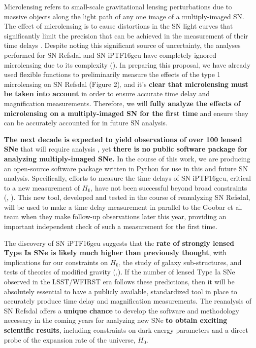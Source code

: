 Microlensing refers to small-scale gravitational lensing
perturbations due to massive objects along the light path of any one image of a
multiply-imaged SN. The effect of microlensing is to cause distortions in the SN light
curves that significantly limit the precision that can be achieved in the measurement of 
their time delays \citep{Dobler:2006}. Despite noting this significant source of uncertainty, the analyses performed for SN Refsdal and SN iPTF16geu 
have completely ignored microlensing due to its complexity (\cite{More:2016,Rodney:2016}). In preparing this proposal, we have already 
used flexible functions to preliminarily measure the effects of the type 1 microlensing on SN Refsdal (Figure 2), and it's 
\textbf{clear that microlensing must be taken into account} in order to ensure accurate time delay and magnification measurements. 
Therefore, we will \textbf{fully analyze the effects of microlensing on a multiply-imaged SN for the first time} and ensure they can be accurately
accounted for in future SN analysis.

\textbf{The next decade is expected to yield observations
of over 100 lensed SNe} that will require analysis \citep{Oguri:2010},
yet \textbf{there is no public software package for analyzing multiply-imaged SNe.}
In the course of this work, we are producing an open-source software package written 
in Python for use in this and future SN analysis. Specifically, efforts to measure the time 
delays of SN iPTF16geu, critical to a new measurement of $H_0$, have not been 
successful beyond broad constraints (\cite{Goobar:2016}, \cite{More:2016}). This new tool,
developed and tested in the course of reanalyzing SN Refsdal, will be used to make a time 
delay measurement in parallel to the Goobar et al. team when they make follow-up observations
later this year, providing an important independent check of such a measurement for the first time. 

The discovery of SN iPTF16geu suggests that the \textbf{rate of strongly lensed Type Ia SNe is likely much higher than
previously thought}, with implications for our constraints on $H_0$, the study of galaxy sub-structures,
and tests of theories of modified gravity (\citet{Goobar:2016},\citet{More:2016}). If the number of lensed Type Ia SNe observed in the LSST/WFIRST
era follows these predictions, then it will be absolutely essential to have a publicly available, standardized 
tool in place to accurately produce time delay and magnification measurements. The reanalysis of SN 
Refsdal offers a \textbf{unique chance} to develop the software and methodology necessary in the coming years for
analyzing new SNe \textbf{to obtain exciting scientific results}, including constraints on dark energy parameters and a
direct probe of the expansion rate of the universe, $H_0$.

